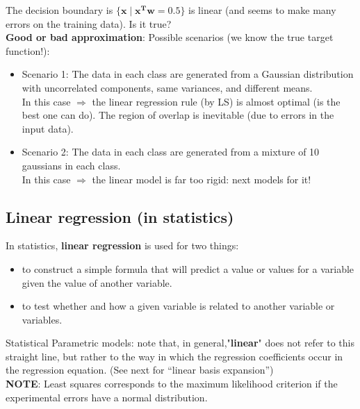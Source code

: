 \documentclass[../main.tex]{subfiles}
\begin{document}
The decision boundary is $\{\mathbf{x} \;|\; \mathbf{x^Tw} = 0.5 \}$ is linear (and seems to make many errors on the training data). Is it true?\\

\noindent \textbf{Good or bad approximation}:
Possible scenarios (we know the true target function!):
\begin{itemize}
    \item Scenario 1: The data in each class are generated from a Gaussian distribution with uncorrelated components, same variances, and different means.\\
    
    In this case $\Rightarrow$ the linear regression rule (by LS) is almost optimal (is the best one can do). The region of overlap is inevitable (due to errors in the input data). 
    
    \item Scenario 2: The data in each class are generated from a mixture of 10 gaussians in each class.\\
    
     In this case  $\Rightarrow$ the linear model is far too rigid: next models for it!
\end{itemize}



\subsection{Linear regression (in statistics)}
In statistics, \textbf{linear regression} is used for two things:
\begin{itemize}
    \item to construct a simple formula that will predict a value or values for a variable
given the value of another variable.
    \item to test whether and how a given variable is related to another variable or variables.
\end{itemize}
Statistical Parametric models: note that, in general,"\textbf{linear}" does not refer to this straight line, but rather to the way in which the regression coefficients occur in the regression equation. (See next for “linear basis expansion”)\\

\noindent\textbf{NOTE}: Least squares corresponds to the maximum likelihood criterion if the
experimental errors have a normal distribution.
\end{document}
